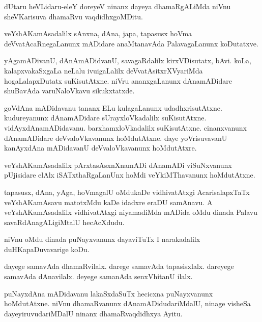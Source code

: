 \documentclass{article}
\begin{document}
\begin{mn}%
dUtaru heVLidaru-eleY doreyeV ninanx dayeya dhamaRgALiMda niVnu sheVKarisuva dhamaRvu 
vaqdidhxgoMDitu.
\end{mn}

\begin{mn}%
veYshAKamAsadalilx sAnxna, dAna, japa, tapasusx hoVma deVvatAcaRnegaLanunx mADidare 
anaMtanavAda PalavagaLanunx koDutatxve.
\end{mn}

\begin{mn}%
yAgamADivanU, dAnAmADidvanU, savagaRdalilx kirxVDisutatx, bAvi. koLa, kalapxvakaSxgaLa 
neLalu ivuigaLalilx deVvatAsitxrXVyariMda hogaLalapxDutatx suKisutAtxne. niVru 
ananxgaLanunx dAnamADidare shuBavAda varuNaloVkavu sikukxtatxde.
\end{mn}

\begin{mn}%
goVdAna mADidavanu tananx ELu kulagaLanunx udadhxrisutAtxne. kudureyanunx dAnamADidare 
sUrayxloVkadalilx suKisutAtxne. vidAyxdAnamADidavanu. barxhamxloVkadalilx suKisutAtxne. 
cinanxvanunx dAnamADidare deVvaloVkavanunx hoMdutAtxne. daye yoVrisuvavanU kanAyxdAna 
mADidavanU deVvaloVkavanunx hoMdutAtxre.
\end{mn}

\begin{mn}%
veYshAKamAsadalilx pArxtasAsxnXnamADi dAnamADi viSuNxvanunx pUjisidare elAlx 
iSATxthaRgaLanUnx hoMdi veYkiMThavanunx hoMdutAtxne.
\end{mn}

\begin{mn}%
tapasusx, dAna, yAga, hoVmagalU oMdukaDe vidhivatAtxgi AcarisalapxTaTx veYshAKamAsavu 
matotxMdu kaDe  idadxre eraDU  samAnavu.  A veYshAKamAsadalilx vidhivatAtxgi niyamadiMda 
mADida oMdu dinada Palavu savaRdAnagALigiMtalU hecAcXdudu.
\end{mn}

\begin{mn}%
niVnu oMdu dinada puNayxvanunx dayaviTuTx I narakadalilx duHKapaDuvavarige koDu.
\end{mn}

\begin{mn}%
dayege samavAda dhamaRvilalx. darege samavAda tapasisxlalx. dareyege samavAda dAnavilalx. 
deyege samanAda senxVhitanU ilalx.
\end{mn}

\begin{mn}%
puNayxdAna mADidavanu lakaSxdaSuTx hecicxna puNayxvanunx hoMdutAtxne. niVnu dhamaRvanunx 
dAnamADidudariMdalU, ninage visheSa dayeyiruvudariMDalU ninanx dhamaRvaqdidhxya Ayitu.
\end{mn}
\end{document}
